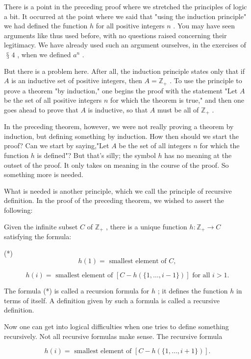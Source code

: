 \documentclass[10pt]{article}
\begin{document}
There is a point in the preceding proof where we stretched the principles of logic a bit. It occurred at the point where we said that "using the induction principle" we had defined the function \(h\) for all positive integers \(n\) . You may have seen arguments like thus used before, with no questions raised concerning their legitimacy. We have already used such an argument ourselves, in the exercises of \(\text{ § }4\) , when we defined \({a}^{n}\) .

But there is a problem here. After all, the induction principle states only that if \(A\) is an inductive set of positive integers, then \(A = {\mathbb{Z}}_{ + }\) . To use the principle to prove a theorem "by induction," one begins the proof with the statement "Let \(A\) be the set of all positive integers \(n\) for which the theorem is true," and then one goes ahead to prove that \(A\) is inductive, so that \(A\) must be all of \({\mathbb{Z}}_{ + }\) .

In the preceding theorem, however, we were not really proving a theorem by induction, but defining something by induction. How then should we start the proof? Can we start by saying,"Let \(A\) be the set of all integers \(n\) for which the function \(h\) is defined"? But that’s silly; the symbol \(h\) has no meaning at the outset of the proof. It only takes on meaning in the course of the proof. So something more is needed.

What is needed is another principle, which we call the principle of recursive definition. In the proof of the preceding theorem, we wished to assert the following:

Given the infinite subset \(C\) of \({\mathbb{Z}}_{ + }\) , there is a unique function \(h : {\mathbb{Z}}_{ + } \rightarrow  C\) satisfying the formula:

(*)
\[
h\left( 1\right)  = \text{ smallest element of }C,
\]

\[
h\left( i\right)  = \text{ smallest element of }\left\lbrack  {C - h\left( {\{ 1,\ldots ,i - 1\} }\right) }\right\rbrack  \text{ for all }i > 1.
\]

The formula (*) is called a recursion formula for \(h\) ; it defines the function \(h\) in terms of itself. A definition given by such a formula is called a recursive definition.

Now one can get into logical difficulties when one tries to define something recursively. Not all recursive formulas make sense. The recursive formula

\[
h\left( i\right)  = \text{ smallest element of }\left\lbrack  {C - h\left( {\{ 1,\ldots ,i + 1\} }\right) }\right\rbrack  .
\]
\end{document}
